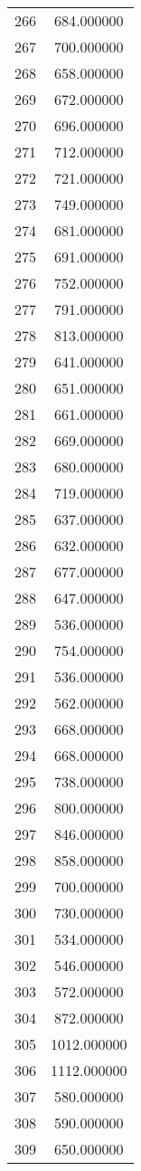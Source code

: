\documentclass[12pt]{article}
\begin{document}
\begin{longtable}{@{}cc@{}}
266 & 684.000000 \\
267 & 700.000000 \\
268 & 658.000000 \\
269 & 672.000000 \\
270 & 696.000000 \\
271 & 712.000000 \\
272 & 721.000000 \\
273 & 749.000000 \\
274 & 681.000000 \\
275 & 691.000000 \\
276 & 752.000000 \\
277 & 791.000000 \\
278 & 813.000000 \\
279 & 641.000000 \\
280 & 651.000000 \\
281 & 661.000000 \\
282 & 669.000000 \\
283 & 680.000000 \\
284 & 719.000000 \\
285 & 637.000000 \\
286 & 632.000000 \\
287 & 677.000000 \\
288 & 647.000000 \\
289 & 536.000000 \\
290 & 754.000000 \\
291 & 536.000000 \\
292 & 562.000000 \\
293 & 668.000000 \\
294 & 668.000000 \\
295 & 738.000000 \\
296 & 800.000000 \\
297 & 846.000000 \\
298 & 858.000000 \\
299 & 700.000000 \\
300 & 730.000000 \\
301 & 534.000000 \\
302 & 546.000000 \\
303 & 572.000000 \\
304 & 872.000000 \\
305 & 1012.000000 \\
306 & 1112.000000 \\
307 & 580.000000 \\
308 & 590.000000 \\
309 & 650.000000 \\

\end{longtable}
\end{document}
